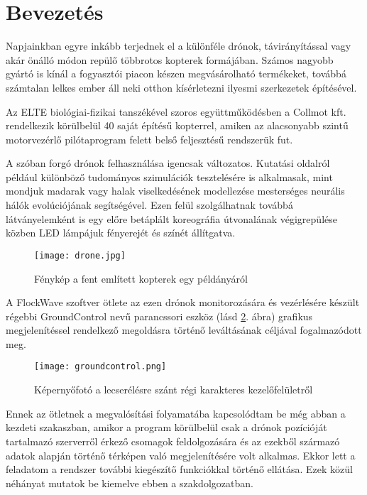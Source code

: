\section{Bevezetés}

Napjainkban egyre inkább terjednek el a különféle drónok, távirányítással vagy
akár önálló módon repülő többrotos kopterek formájában. Számos nagyobb gyártó is
kínál a fogyasztói piacon készen megvásárolható termékeket, továbbá számtalan
lelkes ember áll neki otthon kísérletezni ilyesmi szerkezetek építésével.

Az ELTE biológiai-fizikai tanszékével szoros együttműködésben a Collmot kft.
rendelkezik körülbelül 40 saját építésű kopterrel, amiken az alacsonyabb szintű
motorvezérlő pilótaprogram felett belső feljesztésű rendszerük fut.

A szóban forgó drónok felhasználása igencsak változatos. Kutatási oldalról
például különböző tudományos szimulációk tesztelésére is alkalmasak, mint
mondjuk madarak vagy halak viselkedésének modellezése mesterséges neurális
hálók evolúciójának segítségével. Ezen felül szolgálhatnak továbbá
látványelemként is egy előre betáplált koreográfia útvonalának végigrepülése
közben LED lámpájuk fényerejét és színét állítgatva.

\begin{figure}[h!]
  \center
  \texttt{[image: drone.jpg]}
  \caption{Fénykép a fent említett kopterek egy példányáról}
  \label{fig:drone}
\end{figure}

A FlockWave szoftver ötlete az ezen drónok monitorozására és vezérlésére készült
régebbi GroundControl nevű parancssori eszköz (lásd \ref{fig:groundcontrol}.
ábra) grafikus megjelenítéssel rendelkező megoldásra történő leváltásának
céljával fogalmazódott meg.

\begin{figure}[H]
  \texttt{[image: groundcontrol.png]}
  \caption{Képernyőfotó a lecserélésre szánt régi karakteres kezelőfelületről}
  \label{fig:groundcontrol}
\end{figure}

\noindent Ennek az ötletnek a megvalósítási folyamatába
kapcsolódtam be még abban a kezdeti szakaszban, amikor a program körülbelül csak
a drónok pozícióját tartalmazó szerverről érkező csomagok feldolgozására és az
ezekből származó adatok alapján történő térképen való megjelenítésére volt
alkalmas. Ekkor lett a feladatom a rendszer további kiegészítő funkciókkal
történő ellátása. Ezek közül néhányat mutatok be kiemelve ebben a
szakdolgozatban.
